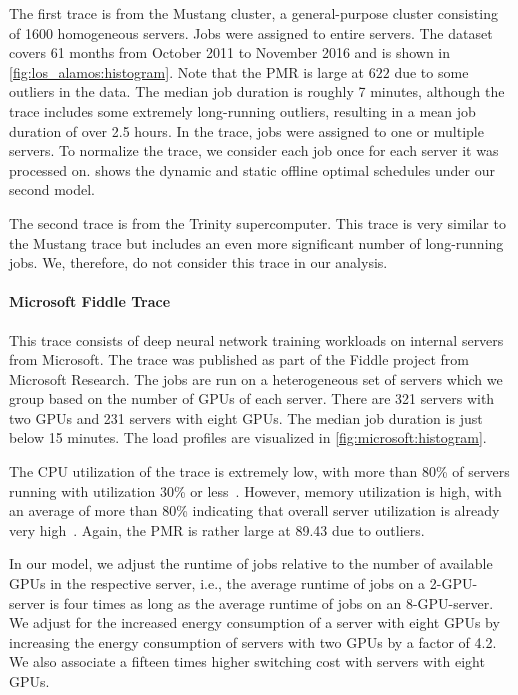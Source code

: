 The first trace is from the Mustang cluster, a general-purpose cluster consisting of 1600 homogeneous servers. Jobs were assigned to entire servers. The dataset covers 61 months from October 2011 to November 2016 and is shown in \cref{fig:los_alamos:histogram}. Note that the PMR is large at $622$ due to some outliers in the data. The median job duration is roughly 7 minutes, although the trace includes some extremely long-running outliers, resulting in a mean job duration of over 2.5 hours. In the trace, jobs were assigned to one or multiple servers. To normalize the trace, we consider each job once for each server it was processed on.  shows the dynamic and static offline optimal schedules under our second model.

The second trace is from the Trinity supercomputer. This trace is very similar to the Mustang trace but includes an even more significant number of long-running jobs. We, therefore, do not consider this trace in our analysis.

\paragraph{Microsoft Fiddle Trace~\cite{Jeon2019}} This trace consists of deep neural network training workloads on internal servers from Microsoft. The trace was published as part of the Fiddle project from Microsoft Research. The jobs are run on a heterogeneous set of servers which we group based on the number of GPUs of each server. There are 321 servers with two GPUs and 231 servers with eight GPUs. The median job duration is just below 15 minutes. The load profiles are visualized in \cref{fig:microsoft:histogram}.

The CPU utilization of the trace is extremely low, with more than 80\% of servers running with utilization 30\% or less~\cite{Santhanam2019}. However, memory utilization is high, with an average of more than 80\% indicating that overall server utilization is already very high~\cite{Santhanam2019}. Again, the PMR is rather large at 89.43 due to outliers.

In our model, we adjust the runtime of jobs relative to the number of available GPUs in the respective server, i.e., the average runtime of jobs on a 2-GPU-server is four times as long as the average runtime of jobs on an 8-GPU-server. We adjust for the increased energy consumption of a server with eight GPUs by increasing the energy consumption of servers with two GPUs by a factor of 4.2. We also associate a fifteen times higher switching cost with servers with eight GPUs.

